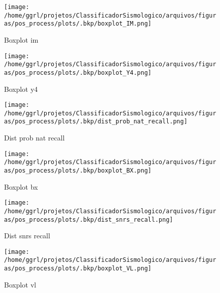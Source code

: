                     \begin{figure}[H]
                        \centering
                        \texttt{[image: /home/ggrl/projetos/ClassificadorSismologico/arquivos/figuras/pos\_process/plots/.bkp/boxplot\_IM.png]}
                        \caption{Boxplot im}
                        \label{fig:boxplot_IM}
                    \end{figure}
                

                    \begin{figure}[H]
                        \centering
                        \texttt{[image: /home/ggrl/projetos/ClassificadorSismologico/arquivos/figuras/pos\_process/plots/.bkp/boxplot\_Y4.png]}
                        \caption{Boxplot y4}
                        \label{fig:boxplot_Y4}
                    \end{figure}
                

                    \begin{figure}[H]
                        \centering
                        \texttt{[image: /home/ggrl/projetos/ClassificadorSismologico/arquivos/figuras/pos\_process/plots/.bkp/dist\_prob\_nat\_recall.png]}
                        \caption{Dist prob nat recall}
                        \label{fig:dist_prob_nat_recall}
                    \end{figure}
                

                    \begin{figure}[H]
                        \centering
                        \texttt{[image: /home/ggrl/projetos/ClassificadorSismologico/arquivos/figuras/pos\_process/plots/.bkp/boxplot\_BX.png]}
                        \caption{Boxplot bx}
                        \label{fig:boxplot_BX}
                    \end{figure}
                

                    \begin{figure}[H]
                        \centering
                        \texttt{[image: /home/ggrl/projetos/ClassificadorSismologico/arquivos/figuras/pos\_process/plots/.bkp/dist\_snrs\_recall.png]}
                        \caption{Dist snrs recall}
                        \label{fig:dist_snrs_recall}
                    \end{figure}
                

                    \begin{figure}[H]
                        \centering
                        \texttt{[image: /home/ggrl/projetos/ClassificadorSismologico/arquivos/figuras/pos\_process/plots/.bkp/boxplot\_VL.png]}
                        \caption{Boxplot vl}
                        \label{fig:boxplot_VL}
                    \end{figure}
                

